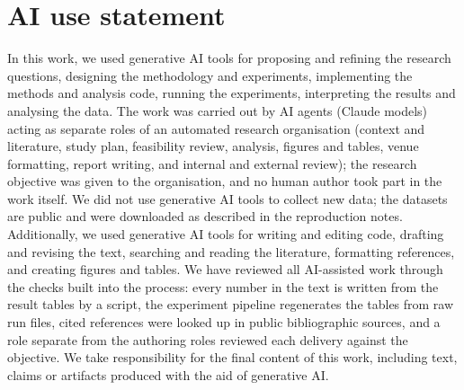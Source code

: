 \section*{AI use statement}
In this work, we used generative AI tools for proposing and refining the research questions, designing the methodology and experiments, implementing the methods and analysis code, running the experiments, interpreting the results and analysing the data. The work was carried out by AI agents (Claude models) acting as separate roles of an automated research organisation (context and literature, study plan, feasibility review, analysis, figures and tables, venue formatting, report writing, and internal and external review); the research objective was given to the organisation, and no human author took part in the work itself. We did not use generative AI tools to collect new data; the datasets are public and were downloaded as described in the reproduction notes. Additionally, we used generative AI tools for writing and editing code, drafting and revising the text, searching and reading the literature, formatting references, and creating figures and tables. We have reviewed all AI-assisted work through the checks built into the process: every number in the text is written from the result tables by a script, the experiment pipeline regenerates the tables from raw run files, cited references were looked up in public bibliographic sources, and a role separate from the authoring roles reviewed each delivery against the objective. We take responsibility for the final content of this work, including text, claims or artifacts produced with the aid of generative AI.
